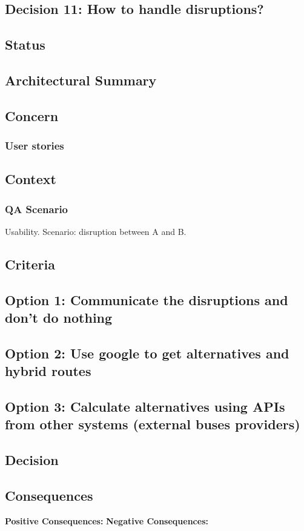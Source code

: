 \subsection{Decision 11: How to handle disruptions?}

\subsection*{Status}

\subsection*{Architectural Summary}


\subsection*{Concern}
\subsubsection*{User stories}

\subsection*{Context}

\subsubsection*{QA Scenario} %
Usability.
Scenario: disruption between A and B.
\subsection*{Criteria}
\begin{itemize}
\end{itemize}

\subsection*{Option 1: Communicate the disruptions and don't do nothing}
\subsection*{Option 2: Use google to get alternatives and hybrid routes}
\subsection*{Option 3: Calculate alternatives using APIs from other systems (external buses providers)}


\subsection*{Decision}

\subsection*{Consequences}
\textbf{Positive Consequences:}
\textbf{Negative Consequences:}

